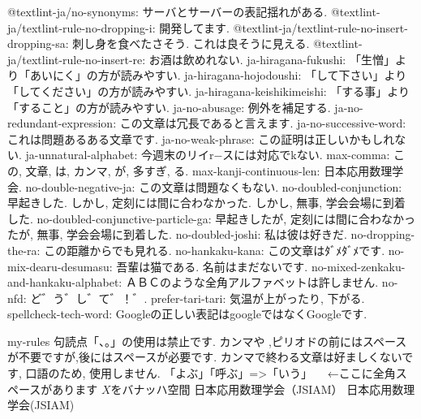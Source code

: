 @textlint-ja/no-synonyms: サーバとサーバーの表記揺れがある. 
@textlint-ja/textlint-rule-no-dropping-i: 開発してます. 
@textlint-ja/textlint-rule-no-insert-dropping-sa: 刺し身を食べたさそう. これは良そうに見える. 
@textlint-ja/textlint-rule-no-insert-re: お酒は飲めれない. 
ja-hiragana-fukushi: 「生憎」より「あいにく」の方が読みやすい. 
ja-hiragana-hojodoushi: 「して下さい」より「してください」の方が読みやすい. 
ja-hiragana-keishikimeishi: 「する事」より「すること」の方が読みやすい. 
ja-no-abusage: 例外を補足する. 
ja-no-redundant-expression: この文章は冗長であると言えます. 
ja-no-successive-word: これは問題あるある文章です. 
ja-no-weak-phrase: この証明は正しいかもしれない. 
ja-unnatural-alphabet: 今週末のリイr−スには対応でkない. 
max-comma: この, 文章, は, カンマ, が, 多すぎ, る. 
max-kanji-continuous-len: 日本応用数理学会. 
no-double-negative-ja: この文章は問題なくもない. 
no-doubled-conjunction: 早起きした. しかし, 定刻には間に合わなかった. しかし, 無事, 学会会場に到着した. 
no-doubled-conjunctive-particle-ga: 早起きしたが, 定刻には間に合わなかったが, 無事, 学会会場に到着した. 
no-doubled-joshi: 私は彼は好きだ. 
no-dropping-the-ra: この距離からでも見れる. 
no-hankaku-kana: この文章はﾀﾞﾒﾀﾞﾒです. 
no-mix-dearu-desumasu: 吾輩は猫である. 名前はまだないです. 
no-mixed-zenkaku-and-hankaku-alphabet: ＡＢＣのような全角アルファベットは許しません. 
no-nfd: ど゛う゛し゛て゛！゛. 
prefer-tari-tari: 気温が上がったり, 下がる. 
spellcheck-tech-word: Googleの正しい表記はgoogleではなくGoogleです. 

my-rules
句読点「、。」の使用は禁止です. 
カンマや ,ピリオドの前にはスペースが不要ですが,後にはスペースが必要です.
カンマで終わる文章は好ましくないです, 
口語のため, 使用しません. 
「よぶ」「呼ぶ」=>「いう」
　←ここに全角スペースがあります
$X$をバナッハ空間
日本応用数理学会（JSIAM）
日本応用数理学会(JSIAM)
